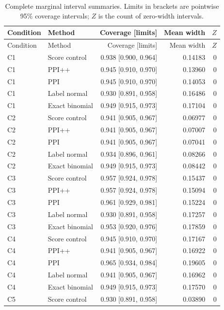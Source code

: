 \documentclass{article}
\begin{document}
\begin{longtable}{llrrr}
\caption{Complete marginal interval summaries. Limits in brackets are pointwise 95\% coverage intervals; $Z$ is the count of zero-width intervals.}\label{tab:complete}\\
\toprule
Condition & Method & Coverage [limits] & Mean width & $Z$\\
\midrule
\endfirsthead
\toprule
Condition & Method & Coverage [limits] & Mean width & $Z$\\
\midrule
\endhead
C1 & Score control & 0.938 [0.900, 0.964] & 0.14183 & 0 \\
C1 & PPI++ & 0.945 [0.910, 0.970] & 0.13960 & 0 \\
C1 & PPI & 0.945 [0.910, 0.970] & 0.14053 & 0 \\
C1 & Label normal & 0.930 [0.891, 0.958] & 0.16486 & 0 \\
C1 & Exact binomial & 0.949 [0.915, 0.973] & 0.17104 & 0 \\
\midrule
C2 & Score control & 0.941 [0.905, 0.967] & 0.06977 & 0 \\
C2 & PPI++ & 0.941 [0.905, 0.967] & 0.07007 & 0 \\
C2 & PPI & 0.941 [0.905, 0.967] & 0.07041 & 0 \\
C2 & Label normal & 0.934 [0.896, 0.961] & 0.08266 & 0 \\
C2 & Exact binomial & 0.949 [0.915, 0.973] & 0.08442 & 0 \\
\midrule
C3 & Score control & 0.957 [0.924, 0.978] & 0.15437 & 0 \\
C3 & PPI++ & 0.957 [0.924, 0.978] & 0.15094 & 0 \\
C3 & PPI & 0.961 [0.929, 0.981] & 0.15224 & 0 \\
C3 & Label normal & 0.930 [0.891, 0.958] & 0.17257 & 0 \\
C3 & Exact binomial & 0.953 [0.920, 0.976] & 0.17859 & 0 \\
\midrule
C4 & Score control & 0.945 [0.910, 0.970] & 0.17167 & 0 \\
C4 & PPI++ & 0.941 [0.905, 0.967] & 0.16922 & 0 \\
C4 & PPI & 0.965 [0.934, 0.984] & 0.19605 & 0 \\
C4 & Label normal & 0.941 [0.905, 0.967] & 0.16962 & 0 \\
C4 & Exact binomial & 0.949 [0.915, 0.973] & 0.17570 & 0 \\
\midrule
C5 & Score control & 0.930 [0.891, 0.958] & 0.03890 & 0 \\

\end{longtable}
\end{document}
